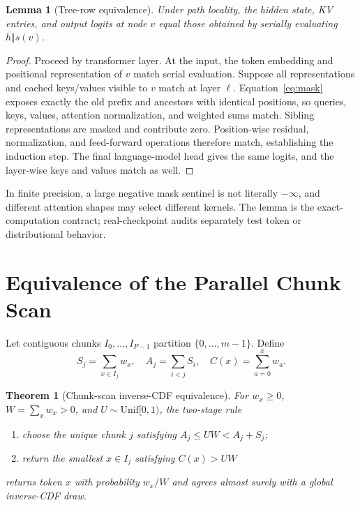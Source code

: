 \documentclass{article}
\newtheorem{theorem}{Theorem}
\newtheorem{lemma}{Lemma}
\begin{document}
\begin{lemma}[Tree-row equivalence]
Under path locality, the hidden state, KV entries, and output logits at node $v$ equal those obtained by serially evaluating $h\Vert s(v)$.
\end{lemma}

\begin{proof}
Proceed by transformer layer.  At the input, the token embedding and positional representation of $v$ match serial evaluation.  Suppose all representations and cached keys/values visible to $v$ match at layer $\ell$.  Equation~\eqref{eq:mask} exposes exactly the old prefix and ancestors with identical positions, so queries, keys, values, attention normalization, and weighted sums match.  Sibling representations are masked and contribute zero.  Position-wise residual, normalization, and feed-forward operations therefore match, establishing the induction step.  The final language-model head gives the same logits, and the layer-wise keys and values match as well.
\end{proof}

In finite precision, a large negative mask sentinel is not literally $-\infty$, and different attention shapes may select different kernels.  The lemma is the exact-computation contract; real-checkpoint audits separately test token or distributional behavior.

\section{Equivalence of the Parallel Chunk Scan}
\label{app:scanproof}

Let contiguous chunks $I_0,\ldots,I_{P-1}$ partition $\{0,\ldots,m-1\}$.  Define
\begin{equation}
S_j=\sum_{x\in I_j}w_x,\quad A_j=\sum_{i<j}S_i,\quad
C(x)=\sum_{a=0}^{x}w_a.
\end{equation}

\begin{theorem}[Chunk-scan inverse-CDF equivalence]
For $w_x\ge0$, $W=\sum_xw_x>0$, and $U\sim\mathrm{Unif}[0,1)$, the two-stage rule
\begin{enumerate}[leftmargin=1.4em,itemsep=1pt]
\item choose the unique chunk $j$ satisfying $A_j\le UW<A_j+S_j$;
\item return the smallest $x\in I_j$ satisfying $C(x)>UW$
\end{enumerate}
returns token $x$ with probability $w_x/W$ and agrees almost surely with a global inverse-CDF draw.
\end{theorem}
\end{document}
